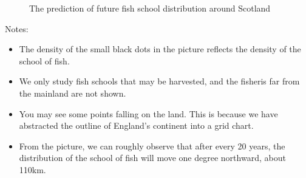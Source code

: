 \documentclass{mcmthesis}
\numberwithin{figure}{section}
\numberwithin{table}{section}
\begin{document}
\begin{figure}[H]
  \hspace{0in}
  \label{Dist}
  \caption{The prediction of future fish school distribution around Scotland}
  \end{figure}




Notes:
\begin{itemize}
  \item The density of the small black dots in the picture reflects the density of the school of fish.
  \item We only study fish schools that may be harvested, and the fisheris far from the mainland are not shown.
  \item You may see some points falling on the land. This is because we have abstracted the outline of England's continent into a grid chart.
  \item From the picture, we can roughly observe that after every 20 years, the distribution of the school of fish will move one degree northward, about 110km.
\end{itemize}
\end{document}
